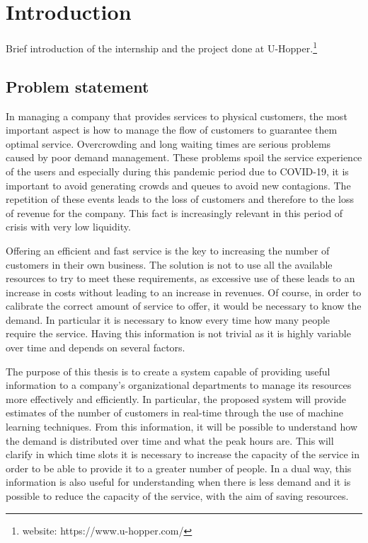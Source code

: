 \chapter{Introduction}
\label{cha:intro}
\vspace{0.4 cm} 

Brief introduction of the internship and the project done at U-Hopper.\footnote{ website: https://www.u-hopper.com/ }


\section{Problem statement}
\label{sec:problem}
\vspace{0.2 cm} 

In managing a company that provides services to physical customers, the most important aspect is how to manage the flow of customers to guarantee them optimal service. Overcrowding and long waiting times are serious problems caused by poor demand management. These problems spoil the service experience of the users and especially during this pandemic period due to COVID-19, it is important to avoid generating crowds and queues to avoid new contagions. The repetition of these events leads to the loss of customers and therefore to the loss of revenue for the company. This fact is increasingly relevant in this period of crisis with very low liquidity.

Offering an efficient and fast service is the key to increasing the number of customers in their own business. The solution is not to use all the available resources to try to meet these requirements, as excessive use of these leads to an increase in costs without leading to an increase in revenues.
Of course, in order to calibrate the correct amount of service to offer, it would be necessary to know the demand. In particular it is necessary to know every time how many people require the service. Having this information is not trivial as it is highly variable over time and depends on several factors.

The purpose of this thesis is to create a system capable of providing useful information to a company's organizational departments to manage its resources more effectively and efficiently. In particular, the proposed system will provide estimates of the number of customers in real-time through the use of machine learning techniques.
From this information, it will be possible to understand how the demand is distributed over time and what the peak hours are. This will clarify in which time slots it is necessary to increase the capacity of the service in order to be able to provide it to a greater number of people. In a dual way, this information is also useful for understanding when there is less demand and it is possible to reduce the capacity of the service, with the aim of saving resources.

